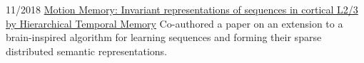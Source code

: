 \documentclass[9pt]{developercv} %
\begin{document}
\newpage
{}

\begin{entrylist}
	\entry
	  {11/2018}
	  {\href{https://www.sciencedirect.com/science/article/pii/S1877050918323792}{Motion Memory: Invariant representations of sequences in cortical L2/3 by Hierarchical Temporal Memory}}
	  {}
	  {Co-authored a paper on an extension to a brain-inspired algorithm for learning sequences and forming their sparse distributed semantic representations.}
\end{entrylist}

\end{document}
